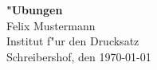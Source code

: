 \documentclass{article}
\begin{document}
\begin{titlepage}
\centering
\vspace*{5cm}
\textbf{\Huge "Ubungen}\\[1.5cm]
\Large Felix Mustermann\\[2mm]
Institut f"ur den Drucksatz\\[5mm]
\large Schreibershof, den \today
\end{titlepage}
\end{document}
